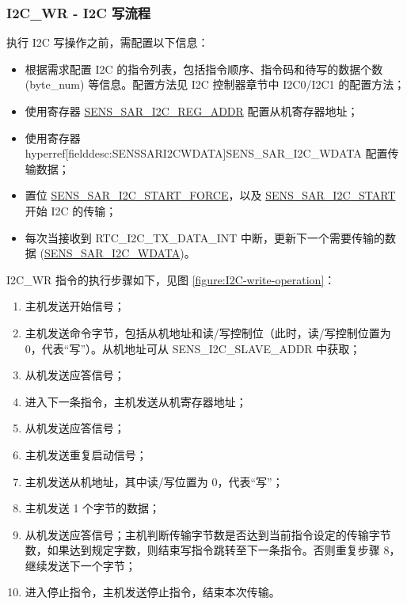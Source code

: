 \documentclass[main\_\_CN.tex]{subfiles}
\begin{document}
\subsubsection {I2C\_WR - I2C 写流程}

执行 I2C 写操作之前，需配置以下信息：

\begin{itemize}
    \item 根据需求配置 I2C 的指令列表，包括指令顺序、指令码和待写的数据个数 (byte\_num) 等信息。配置方法见 I2C 控制器章节中 I2C0/I2C1 的配置方法；
    \item 使用寄存器 \hyperref[fielddesc:SENSSARI2CREGADDR]{SENS\_SAR\_I2C\_REG\_ADDR} 配置从机寄存器地址；
    \item 使用寄存器 hyperref[fielddesc:SENSSARI2CWDATA]{SENS\_SAR\_I2C\_WDATA} 配置传输数据；
    \item 置位 \hyperref[fielddesc:SENSSARI2CSTARTFORCE]{SENS\_SAR\_I2C\_START\_FORCE}，以及 \hyperref[fielddesc:SENSSARI2CSTART]{SENS\_SAR\_I2C\_START} 开始 I2C 的传输；
    \item 每次当接收到 RTC\_I2C\_TX\_DATA\_INT 中断，更新下一个需要传输的数据 (\hyperref[fielddesc:SENSSARI2CWDATA]{SENS\_SAR\_I2C\_WDATA})。
\end{itemize}


I2C\_WR 指令的执行步骤如下，见图 \ref{figure:I2C-write-operation}：

\begin{enumerate}
    \item 主机发送开始信号；
    \item 主机发送命令字节，包括从机地址和读/写控制位（此时，读/写控制位置为 0，代表“写”）。从机地址可从 SENS\_I2C\_SLAVE\_ADDR 中获取；
    \item 从机发送应答信号；
    \item 进入下一条指令，主机发送从机寄存器地址；
    \item 从机发送应答信号；
    \item 主机发送重复启动信号；
    \item 主机发送从机地址，其中读/写位置为 0，代表“写”；
    \item 主机发送 1 个字节的数据；
    \item 从机发送应答信号；主机判断传输字节数是否达到当前指令设定的传输字节数，如果达到规定字数，则结束写指令跳转至下一条指令。否则重复步骤 8，继续发送下一个字节；
    \item 进入停止指令，主机发送停止指令，结束本次传输。
\end{enumerate}
\end{document}
